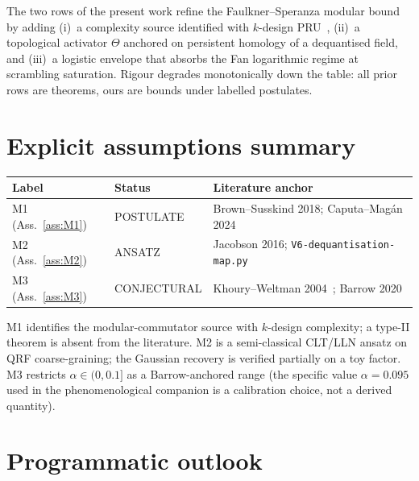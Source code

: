 \documentclass[aps,prd,superscriptaddress,nofootinbib,floatfix,10pt]{revtex4-2}
\theoremstyle{remark}
\begin{document}
The two rows of the present work refine the Faulkner--Speranza
modular bound by adding (i)~a complexity source identified with
$k$-design PRU~\cite{MaHuang2025}, (ii)~a topological activator
$\Theta$ anchored on persistent homology of a dequantised field, and
(iii)~a logistic envelope that absorbs the Fan logarithmic regime at
scrambling saturation. Rigour degrades monotonically down the table:
all prior rows are theorems, ours are bounds under labelled
postulates.

\section{Explicit assumptions summary}
\label{sec:assumptions}

\begin{center}
\begin{tabular}{lll}
\hline
Label & Status & Literature anchor \\
\hline
M1 (Ass.~\ref{ass:M1})  & POSTULATE    & Brown--Susskind 2018;
                                        Caputa--Mag\'an 2024 \\
M2 (Ass.~\ref{ass:M2})  & ANSATZ       & Jacobson 2016;
                                        \texttt{V6-dequantisation-map.py} \\
M3 (Ass.~\ref{ass:M3})  & CONJECTURAL  & Khoury--Weltman 2004~\cite{KhouryWeltman2004};
                                        Barrow 2020 \\
\hline
\end{tabular}
\end{center}

M1 identifies the modular-commutator source with $k$-design complexity;
a type-II theorem is absent from the literature. M2 is a
semi-classical CLT/LLN ansatz on QRF coarse-graining; the Gaussian
recovery is verified partially on a toy factor. M3 restricts
$\alpha \in (0, 0.1]$ as a Barrow-anchored range (the specific value
$\alpha = 0.095$ used in the phenomenological companion is a
calibration choice, not a derived quantity).

\section{Programmatic outlook}
\label{sec:outlook}
\end{document}
